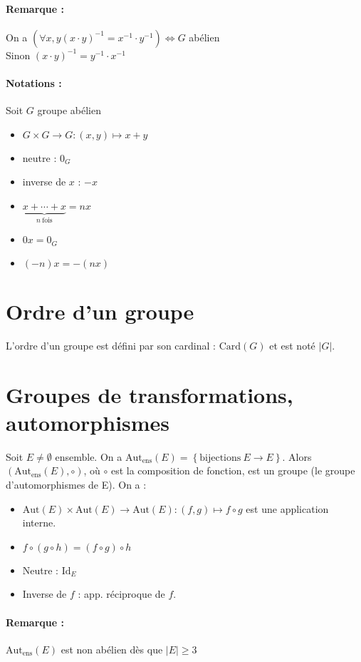 \documentclass[a4paper,10pt]{report}
\newcommand{\set}[1]{\left\lbrace #1 \right\rbrace } %
\newcommand{\underb}[2]{\underset{ #1 }{\underbrace{ #2 }}}
\newcommand{\id}{\mathrm{Id}} %
\newcommand{\Autens}[1]{\text{Aut}_{\text{ens}}\left(#1\right)}
\begin{document}
   \paragraph{Remarque : } On a $(\forall x,y (x \cdot y)^{-1} = x^{-1} \cdot
   y^{-1}) \iff G$ abélien\\
   Sinon $(x \cdot y)^{-1}=y^{-1} \cdot x^{-1}$

   \paragraph{Notations : } Soit $G$ groupe abélien
   \begin{itemize}
     \item $G \times G \to G  : (x,y) \mapsto x+y$
     \item neutre : $0_G$
     \item inverse de $x$ : $-x$
     \item $\underb{n \  \mathrm{fois}}{x + \cdots + x} = nx$
     \item $0x = 0_G$
     \item $(-n)x=-(nx)$
   \end{itemize}

  \section{Ordre d'un groupe}
   L'ordre d'un groupe est défini par son cardinal : $\mathrm{Card}(G)$ et est
   noté $|G|$.  

  \section{Groupes de transformations, automorphismes}
   Soit $E \ne \emptyset$ ensemble.
   On a $\Autens{E}=\set{\mathrm{bijections}\  E \to E}$.
   Alors $(\Autens{E}, \circ)$, où \(\circ\) est la composition de fonction, est un groupe (le groupe d'automorphismes de E).
   On a :
   \begin{itemize}
     \item $\mathrm{Aut}(E) \times \mathrm{Aut}(E) \to 
       \mathrm{Aut}(E) : (f,g) \mapsto f \circ g$ est une application interne.
     \item $f \circ (g \circ h) = (f \circ g) \circ h$
     \item Neutre : $\id_E$
     \item Inverse de $f$ : app. réciproque de $f$.
   \end{itemize} 
   \paragraph{Remarque : } $\Autens{E}$ est non abélien dès que $|E| \ge 3$
\end{document}
